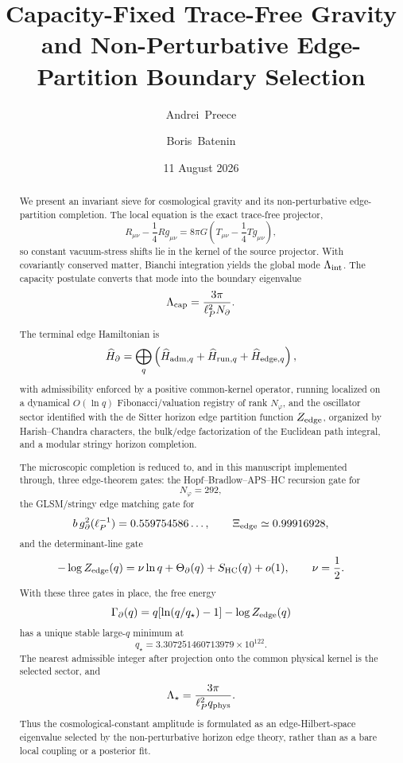 \documentclass[aps,prd,reprint,nofootinbib,superscriptaddress,floatfix]{revtex4-2}
\numberwithin{equation}{section}
\theoremstyle{definition}
\theoremstyle{plain}
\begin{document}
\title{Capacity-Fixed Trace-Free Gravity and Non-Perturbative Edge-Partition Boundary Selection}

\author{Andrei~Preece}

\author{Boris~Batenin}

\date{11 August 2026}

\begin{abstract}
We present an invariant sieve for cosmological gravity and its
non-perturbative edge-partition completion.  The local equation is the exact
trace-free projector,
\[
R_{\mu\nu}-\frac14 R g_{\mu\nu}
=
8\pi G\left(T_{\mu\nu}-\frac14 T g_{\mu\nu}\right),
\]
so constant vacuum-stress shifts lie in the kernel of the source projector.
With covariantly conserved matter, Bianchi integration yields the global mode
\(\Lambda_{\rm int}\).  The capacity postulate converts that mode into the
boundary eigenvalue
\[
\Lambda_{\rm cap}=\frac{3\pi}{\ell_P^2 N_\partial}.
\]

The terminal edge Hamiltonian is
\[
\widehat H_\partial
=
\bigoplus_q
\left(
\widehat H_{{\rm adm},q}
+
\widehat H_{{\rm run},q}
+
\widehat H_{{\rm edge},q}
\right),
\]
with admissibility enforced by a positive common-kernel operator, running
localized on a dynamical \(O(\ln q)\) Fibonacci/valuation registry of rank
\(N_\varphi\), and the oscillator sector identified with the de Sitter horizon
edge partition function \(Z_{\rm edge}\), organized by Harish--Chandra
characters, the bulk/edge factorization of the Euclidean path integral, and a
modular stringy horizon completion.

The microscopic completion is reduced to, and in this manuscript implemented
through, three edge-theorem gates: the Hopf--Bradlow--APS--HC recursion gate
for
\[
N_\varphi=292,
\]
the GLSM/stringy edge matching gate for
\[
b\,g_\partial^2(\ell_P^{-1})=0.559754586\ldots,
\qquad
\Xi_{\rm edge}\simeq0.99916928,
\]
and the determinant-line gate
\[
-\log Z_{\rm edge}(q)
=
\nu\ln q+\Theta_\partial(q)+S_{\rm HC}(q)+o(1),
\qquad
\nu=\frac12.
\]
With these three gates in place, the free energy
\[
\Gamma_\partial(q)
=
q[\ln(q/q_\star)-1]-\log Z_{\rm edge}(q)
\]
has a unique stable large-\(q\) minimum at
\[
q_\star=3.307251460713979\times10^{122}.
\]
The nearest admissible integer after projection onto the common physical
kernel is the selected sector, and
\[
\Lambda_\star=\frac{3\pi}{\ell_P^2 q_{\rm phys}}.
\]
Thus the cosmological-constant amplitude is formulated as an edge-Hilbert-space
eigenvalue selected by the non-perturbative horizon edge theory, rather than
as a bare local coupling or a posterior fit.

\end{abstract}
\end{document}

